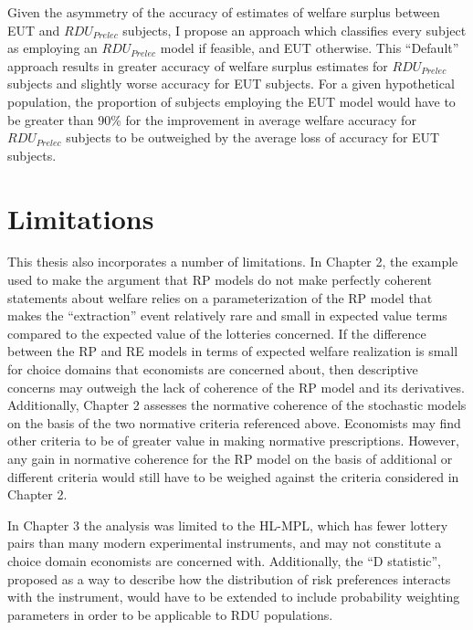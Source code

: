 \documentclass[../main.tex]{subfiles}
\begin{document}
Given the asymmetry of the accuracy of estimates of welfare surplus between EUT and $\mathit{RDU_{Prelec}}$ subjects, I propose an approach which classifies every subject as employing an $\mathit{RDU_{Prelec}}$ model if feasible, and EUT otherwise.
This \enquote{Default} approach results in greater accuracy of welfare surplus estimates for $\mathit{RDU_{Prelec}}$ subjects and slightly worse accuracy for EUT subjects.
For a given hypothetical population, the proportion of subjects employing the EUT model would have to be greater than 90\% for the improvement in average welfare accuracy for $\mathit{RDU_{Prelec}}$ subjects to be outweighed by the average loss of accuracy for EUT subjects.



\section{Limitations}
This thesis also incorporates a number of limitations.
In Chapter 2, the example used to make the argument that RP models do not make perfectly coherent statements about welfare relies on a parameterization of the RP model that makes the \enquote{extraction} event relatively rare and small in expected value terms compared to the expected value of the lotteries concerned.
If the difference between the RP and RE models in terms of expected welfare realization is small for choice domains that economists are concerned about, then descriptive concerns may outweigh the lack of coherence of the RP model and its derivatives.
Additionally, Chapter 2 assesses the normative coherence of the stochastic models on the basis of the two normative criteria referenced above.
Economists may find other criteria to be of greater value in making normative prescriptions.
However, any gain in normative coherence for the RP model on the basis of additional or different criteria would still have to be weighed against the criteria considered in Chapter 2.

In Chapter 3 the analysis was limited to the HL-MPL, which has fewer lottery pairs than many modern experimental instruments, and may not constitute a choice domain economists are concerned with.
Additionally, the \enquote{D statistic}, proposed as a way to describe how the distribution of risk preferences interacts with the instrument, would have to be extended to include probability weighting parameters in order to be applicable to RDU populations.
\end{document}
